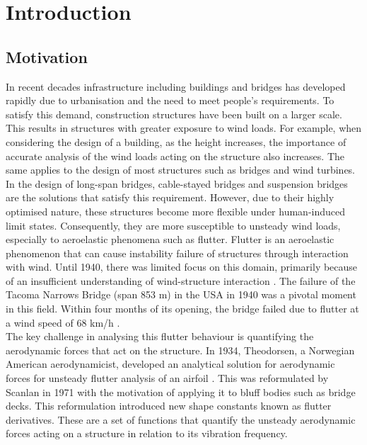 \documentclass[../main]{subfiles}
\begin{document}
\chapter{Introduction}
\label{cha:introduction}

\section{Motivation}

In recent decades infrastructure including buildings and bridges has developed rapidly due to urbanisation and the need to 
meet people's requirements. To satisfy this demand, construction structures have been built on a larger scale. This results 
in structures with greater exposure to wind loads. For example, when considering the design of a building, as the height 
increases, the importance of accurate analysis of the wind loads acting on the structure also increases. The same applies to 
the design of most structures such as bridges and wind turbines. \\

In the design of long-span bridges, cable-stayed bridges and suspension bridges are the solutions that satisfy this requirement. 
However, due to their highly optimised nature, these structures become more flexible under human-induced limit states. 
Consequently, they are more susceptible to unsteady wind loads, especially to aeroelastic phenomena such as flutter. 
Flutter is an aeroelastic phenomenon that can cause instability failure of structures through interaction with wind. 
Until 1940, there was limited focus on this domain, primarily because of an insufficient understanding of wind-structure 
interaction \cite{gimsing2012}. The failure of the Tacoma Narrows Bridge (span 853 m) in the USA in 1940 was a pivotal 
moment in this field. Within four months of its opening, the bridge failed due to flutter at a wind speed of 68 km/h \cite{abbas2017, billah1991}. \\

The key challenge in analysing this flutter behaviour is quantifying the aerodynamic forces that act on the structure. 
In 1934, Theodorsen, a Norwegian American aerodynamicist, developed an analytical solution for aerodynamic forces for 
unsteady flutter analysis of an airfoil \cite{TheodorsenGarrick1934}. This was reformulated by Scanlan in 1971 \cite{scanlan1971} 
with the motivation of applying it to bluff bodies such as bridge decks. This reformulation introduced new shape constants 
known as flutter derivatives. These are a set of functions that quantify the unsteady aerodynamic forces acting on a 
structure in relation to its vibration frequency. \\
\end{document}
